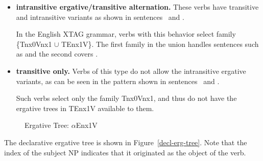 \begin{itemize}
\item {\bf intransitive ergative/transitive alternation.}  These verbs have
transitive and intransitive variants as shown in sentences~ and
.


In the English XTAG grammar, verbs with this behavior select family
\{Tnx0Vnx1 $\cup$ TEnx1V\}.  The first family in the union handles
sentences such as  and the second covers .

\item {\bf transitive only.}  Verbs of this type do not allow the
intransitive ergative variants, as can be seen in the pattern shown in
sentences~ and .


Such verbs select only the family Tnx0Vnx1, and thus do not have the
ergative trees in TEnx1V available to them.

\end{itemize}

\begin{figure}[htb]
\centering
\mbox{}
\caption{Ergative Tree: $\alpha$Enx1V}
\label{decl-erg-tree}
\label{2;14,1}
\end{figure}

The declarative ergative tree is shown in Figure~\ref{decl-erg-tree}.
Note that the index of the subject NP indicates that it originated as
the object of the verb.























